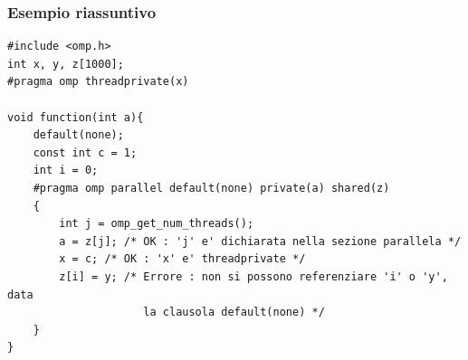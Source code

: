 \documentclass[10pt, letterpaper]{report}
\begin{document}
\subsubsection{Esempio riassuntivo}
\begin{lstlisting}[style=CStyle]
#include <omp.h>
int x, y, z[1000];
#pragma omp threadprivate(x)

void function(int a){
    default(none);
    const int c = 1;
    int i = 0;
    #pragma omp parallel default(none) private(a) shared(z)
    {
        int j = omp_get_num_threads();
        a = z[j]; /* OK : 'j' e' dichiarata nella sezione parallela */
        x = c; /* OK : 'x' e' threadprivate */
        z[i] = y; /* Errore : non si possono referenziare 'i' o 'y', data 
                     la clausola default(none) */
    }
}
\end{lstlisting}
\flowerLine 
\end{document}
